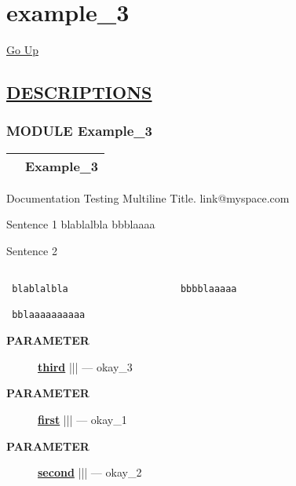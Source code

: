 \chapter*{\color{headfile}
example_3
}
\hypertarget{ecldoc:toc:example_3}{}
\hyperlink{ecldoc:toc:root}{Go Up}


\section*{\underline{\textsf{DESCRIPTIONS}}}
\subsection*{\textsf{\colorbox{headtoc}{\color{white} MODULE}
Example\_3}}

\hypertarget{ecldoc:Example_3}{}

{\renewcommand{\arraystretch}{1.5}
\begin{tabularx}{\textwidth}{|>{\raggedright\arraybackslash}l|X|}
\hline
\hspace{0pt}\mytexttt{\color{red} } & \textbf{Example\_3} \\
\hline
\end{tabularx}
}

\par





Documentation Testing Multiline Title. link@myspace.com 
\par
 Sentence 1 blablalbla bbblaaaa 


\par
 Sentence 2 


\begin{verbatim}

 blablalbla                    bbbblaaaaa

 bblaaaaaaaaaa
 \end{verbatim}








\par
\begin{description}
\item [\colorbox{tagtype}{\color{white} \textbf{\textsf{PARAMETER}}}] \textbf{\underline{third}} |||  --- okay\_3
\item [\colorbox{tagtype}{\color{white} \textbf{\textsf{PARAMETER}}}] \textbf{\underline{first}} |||  --- okay\_1
\item [\colorbox{tagtype}{\color{white} \textbf{\textsf{PARAMETER}}}] \textbf{\underline{second}} |||  --- okay\_2
\end{description}






